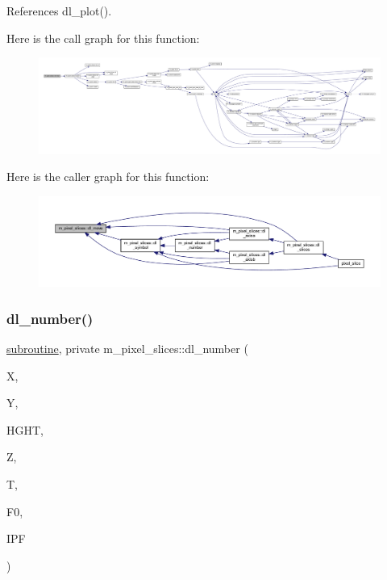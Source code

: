 References dl\+\_\+plot().

Here is the call graph for this function\+:
\nopagebreak
\begin{figure}[H]
\begin{center}
\leavevmode
\includegraphics[width=350pt]{namespacem__pixel__slices_ab9e9530d7fb4fbea1bc5d52744498731_cgraph}
\end{center}
\end{figure}
Here is the caller graph for this function\+:
\nopagebreak
\begin{figure}[H]
\begin{center}
\leavevmode
\includegraphics[width=350pt]{namespacem__pixel__slices_ab9e9530d7fb4fbea1bc5d52744498731_icgraph}
\end{center}
\end{figure}
\mbox{\label{namespacem__pixel__slices_a7d9372496e88c384aea5ad1b26750d1b}} 
\subsubsection{\texorpdfstring{dl\+\_\+number()}{dl\_number()}}
{\footnotesize\ttfamily \hyperlink{M__stopwatch_83_8txt_acfbcff50169d691ff02d4a123ed70482}{subroutine}, private m\+\_\+pixel\+\_\+slices\+::dl\+\_\+number (\begin{DoxyParamCaption}\item[{}]{X,  }\item[{}]{Y,  }\item[{}]{H\+G\+HT,  }\item[{}]{Z,  }\item[{}]{T,  }\item[{}]{F0,  }\item[{}]{I\+PF }\end{DoxyParamCaption})\hspace{0.3cm}{\ttfamily [private]}}



